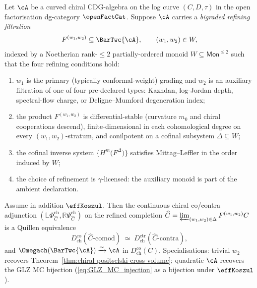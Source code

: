 \begin{theorem}
\label{thm:chiral-positselski-refined-ambient}
Let $\cA$ be a curved chiral CDG-algebra on the log curve
$(C, D, \tau)$ in the open factorisation dg-category
$\openFactCat$. Suppose $\cA$ carries a \emph{bigraded refining
filtration}
\[
 F^{(w_1, w_2)} \subseteq \BarTwc{\cA},
 \qquad
 (w_1, w_2) \in W,
\]
indexed by a Noetherian rank-$\leq 2$ partially-ordered monoid
$W \subseteq \mathsf{Mon}^{\le 2}$ such that the four refining
conditions hold:
\begin{enumerate}[label=\textup{(R\arabic*)}]
\item $w_1$ is the primary \textup{(}typically conformal-weight\textup{)}
grading and $w_2$ is an auxiliary filtration of one of four
pre-declared types: Kazhdan, log-Jordan depth, spectral-flow charge,
or Deligne--Mumford degeneration index;
\item the product $F^{(w_1, w_2)}$ is differential-stable
\textup{(}curvature $m_0$ and chiral cooperations descend\textup{)},
finite-dimensional in each cohomological degree on every
$(w_1, w_2)$-stratum, and conilpotent on a cofinal subsystem
$\Delta \subseteq W$;
\item the cofinal inverse system
$\bigl\{ H^m\bigl(F^\Delta\bigr) \bigr\}$ satisfies Mittag--Leffler
in the order induced by $W$;
\item the choice of refinement is $\gamma$-licensed: the auxiliary
monoid is part of the ambient declaration.
\end{enumerate}
Assume in addition $\effKoszul$. Then the continuous chiral
co/contra adjunction
$(\mathbb{L}\Phi^{\mathrm{ch}}_{\widehat C},
\mathbb{R}\Psi^{\mathrm{ch}}_{\widehat C})$ on the refined completion
$\widehat C = \varprojlim_{(w_1, w_2) \in \Delta} F^{(w_1, w_2)} C$
is a Quillen equivalence
\[
 D^{\mathrm{co}}_{\mathrm{ch}}(\widehat C\text{-comod})
 \;\simeq\;
 D^{\mathrm{ctr}}_{\mathrm{ch}}(\widehat C\text{-contra}),
\]
and $\Omegach(\BarTwc{\cA}) \xrightarrow{\sim} \cA$ in
$D^{\mathrm{co}}_{\mathrm{ch}}(C)$. Specialisations: trivial $w_2$
recovers Theorem~\ref{thm:chiral-positselski-cross-volume}; quadratic
$\cA$ recovers the GLZ MC bijection
\textup{(}\cref{eq:GLZ_MC_injection} as a bijection under
$\effKoszul$\textup{)}.
\end{theorem}

